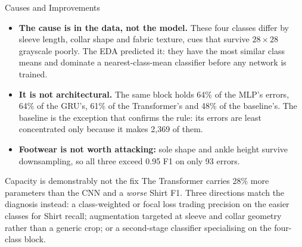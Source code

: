\begin{frame}{Causes and Improvements}
\small
\begin{itemize}
    \item \textbf{The cause is in the data, not the model.} These four classes differ by sleeve length,
          collar shape and fabric texture, cues that survive $28\times28$ grayscale poorly. The EDA
          predicted it: they have the most similar class means and dominate a nearest-class-mean
          classifier before any network is trained.
    \item \textbf{It is not architectural.} The same block holds 64\% of the MLP's errors, 64\% of the
          GRU's, 61\% of the Transformer's and 48\% of the baseline's. The baseline is the exception
          that confirms the rule: its errors are least concentrated only because it makes 2{,}369 of them.
    \item \textbf{Footwear is not worth attacking:} sole shape and ankle height survive downsampling,
          so all three exceed 0.95 F1 on only 93 errors.
\end{itemize}

\vspace{2pt}
\begin{block}{Capacity is demonstrably not the fix}
\small
The Transformer carries 28\% more parameters than the CNN and a \emph{worse} Shirt F1. Three
directions match the diagnosis instead: a class-weighted or focal loss trading precision on the
easier classes for Shirt recall; augmentation targeted at sleeve and collar geometry rather than a
generic crop; or a second-stage classifier specialising on the four-class block.
\end{block}
\end{frame}
